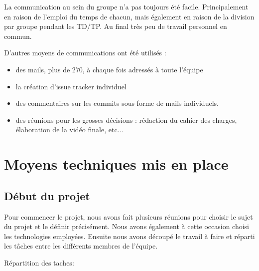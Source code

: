 \documentclass{report}
\begin{document}
La communication au sein du groupe n’a pas toujours été facile. Principalement en raison de l’emploi du temps de chacun, mais également en raison de la division par groupe pendant les TD/TP. Au final très peu de travail personnel en commun.

D’autres moyens de communications ont été utilisés :
\begin{itemize}
\item des mails, plus de 270, à chaque fois adressés à toute l’équipe
\item la création d’issue tracker individuel
\item des commentaires sur les commits sous forme de mails individuels.
\item des réunions pour les grosses décisions : rédaction du cahier des charges, élaboration de la vidéo finale, etc...
\end{itemize}

\section{Moyens techniques mis en place}

\subsection{Début du projet}
Pour commencer le projet, nous avons fait plusieurs réunions pour choisir le sujet du projet et le définir précisément. Nous avons également à cette occasion choisi les technologies employées.
Ensuite nous avons découpé le travail à faire et réparti les tâches entre les différents membres de l’équipe.

Répartition des taches:
\end{document}
